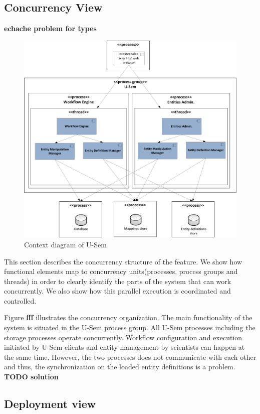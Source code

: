 \documentclass[a4paper, notitlepage]{article}
\begin{document}
\subsection{Concurrency View}
\textbf{echache problem for types}

\begin{figure}[h!]
  \centering
  	\includegraphics[scale=0.5]{functional/concur.png}
  \caption{Context diagram of U-Sem }
  \label{fig_context}
\end{figure}

This section describes the concurrency structure of the feature. We show how functional elements map to concurrency units(processes, process groups and threads) in order to clearly identify the parts of the system that can work concurrently. We also show how this parallel execution is coordinated and controlled.

Figure \textbf{fff} illustrates the concurrency organization. The main functionality of the system is situated in the U-Sem process group. All U-Sem processes including the storage processes operate concurrently. Workflow configuration and execution initiated by U-Sem clients and entity management by scientists can happen at the same time. However, the two processes does not communicate with each other and thus, the synchronization on the loaded entity definitions is a problem. \textbf{TODO solution}


\subsection{Deployment view}
\end{document}

